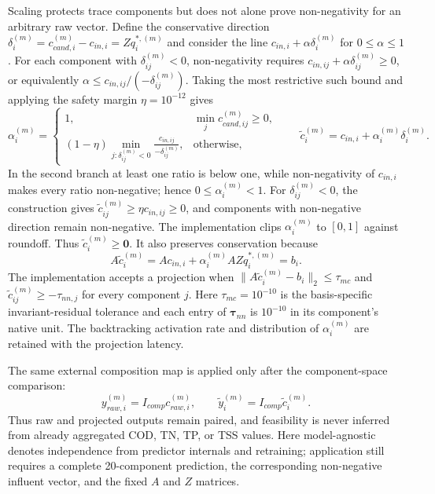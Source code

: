 \documentclass[a4paper,fleqn]{cas-sc}
\begin{document}
Scaling protects trace components but does not alone prove non-negativity for an arbitrary raw vector. Define the conservative direction $\delta_i^{(m)}=c_{cand,i}^{(m)}-c_{in,i}=Zq_i^{*,(m)}$ and consider the line $c_{in,i}+\alpha\delta_i^{(m)}$ for $0\leq\alpha\leq1$. For each component with $\delta_{ij}^{(m)}<0$, non-negativity requires
$c_{in,ij}+\alpha\delta_{ij}^{(m)}\geq0$, or equivalently
$\alpha\leq c_{in,ij}/(-\delta_{ij}^{(m)})$. Taking the most restrictive such bound and applying the safety margin $\eta=10^{-12}$ gives
\begin{equation}
\alpha_i^{(m)}=
\begin{cases}
1, & \min_j c_{cand,ij}^{(m)}\geq0,\\
(1-\eta)\displaystyle\min_{j:\delta_{ij}^{(m)}<0}
\frac{c_{in,ij}}{-\delta_{ij}^{(m)}}, & \text{otherwise},
\end{cases}
\qquad
\tilde c_i^{(m)}=c_{in,i}+\alpha_i^{(m)}\delta_i^{(m)}.
\label{eq:positivity_backtracking}
\end{equation}
In the second branch at least one ratio is below one, while non-negativity of $c_{in,i}$ makes every ratio non-negative; hence $0\leq\alpha_i^{(m)}<1$. For $\delta_{ij}^{(m)}<0$, the construction gives $\tilde c_{ij}^{(m)}\geq\eta c_{in,ij}\geq0$, and components with non-negative direction remain non-negative. The implementation clips $\alpha_i^{(m)}$ to $[0,1]$ against roundoff. Thus $\tilde c_i^{(m)}\geq\mathbf{0}$. It also preserves conservation because
\begin{equation}
A\tilde c_i^{(m)}
=Ac_{in,i}+\alpha_i^{(m)}AZq_i^{*,(m)}
=b_i.
\end{equation}
The implementation accepts a projection when $\|A\tilde c_i^{(m)}-b_i\|_2\leq\tau_{mc}$ and $\tilde c_{ij}^{(m)}\geq-\tau_{nn,j}$ for every component $j$. Here $\tau_{mc}=10^{-10}$ is the basis-specific invariant-residual tolerance and each entry of $\boldsymbol{\tau}_{nn}$ is $10^{-10}$ in its component's native unit. The backtracking activation rate and distribution of $\alpha_i^{(m)}$ are retained with the projection latency.

The same external composition map is applied only after the component-space comparison:
\begin{equation}
\label{eq:reported_composites}
y_{raw,i}^{(m)}=I_{comp}c_{raw,i}^{(m)},\qquad
\tilde y_i^{(m)}=I_{comp}\tilde c_i^{(m)}.
\end{equation}
Thus raw and projected outputs remain paired, and feasibility is never inferred from already aggregated COD, TN, TP, or TSS values. Here model-agnostic denotes independence from predictor internals and retraining; application still requires a complete 20-component prediction, the corresponding non-negative influent vector, and the fixed $A$ and $Z$ matrices.
\end{document}
